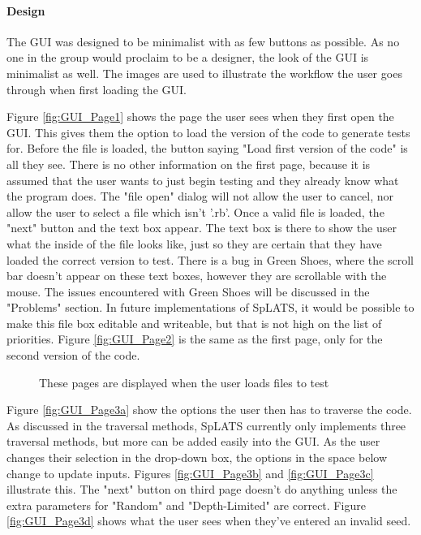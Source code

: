   \paragraph{Design}
  The GUI was designed to be minimalist with as few buttons as possible. As no one in the group would proclaim to be a designer, the look of the GUI is minimalist as well. The images are used to illustrate the workflow the user goes through when first loading the GUI.
  
  Figure \ref{fig:GUI_Page1} shows the page the user sees when they first open the GUI. This gives them the option to load the version of the code to generate tests for. Before the file is loaded, the button saying "Load first version of the code" is all they see. There is no other information on the first page, because it is assumed that the user wants to just begin testing and they already know what the program does. The "file open" dialog will not allow the user to cancel, nor allow the user to select a file which isn't '.rb'. Once a valid file is loaded, the "next" button and the text box appear. The text box is there to show the user what the inside of the file looks like, just so they are certain that they have loaded the correct version to test. There is a bug in Green Shoes, where the scroll bar doesn't appear on these text boxes, however they are scrollable with the mouse. The issues encountered with Green Shoes will be discussed in the "Problems" section. In future implementations of SpLATS, it would be possible to make this file box editable and writeable, but that is not high on the list of priorities.
Figure \ref{fig:GUI_Page2} is the same as the first page, only for the second version of the code.
  
  \begin{figure}
    \centering
    \caption{These pages are displayed when the user loads files to test}
    \label{fig:GUI_LoadVersions}
  \end{figure}
  
  Figure \ref{fig:GUI_Page3a} show the options the user then has to traverse the code. As discussed in the traversal methods, SpLATS currently only implements three traversal methods, but more can be added easily into the GUI. As the user changes their selection in the drop-down box, the options in the space below change to update inputs. Figures \ref{fig:GUI_Page3b} and \ref{fig:GUI_Page3c} illustrate this. The "next" button on third page doesn't do anything unless the extra parameters for "Random" and "Depth-Limited" are correct. Figure \ref{fig:GUI_Page3d} shows what the user sees when they've entered an invalid seed.
  
